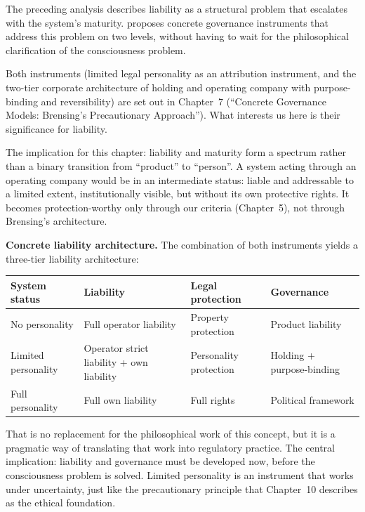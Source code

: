 \documentclass[acmlarge, nonacm]{acmart}
\begin{document}
The preceding analysis describes liability as a structural problem that escalates with the system's maturity. \citet{brensing2026} proposes concrete governance instruments that address this problem on two levels, without having to wait for the philosophical clarification of the consciousness problem.

Both instruments (limited legal personality as an attribution instrument, and the two-tier corporate architecture of holding and operating company with purpose-binding and reversibility) are set out in Chapter~7 (``Concrete Governance Models: Brensing's Precautionary Approach''). What interests us here is their significance for liability.

The implication for this chapter: liability and maturity form a spectrum rather than a binary transition from ``product'' to ``person''. A system acting through an operating company would be in an intermediate status: liable and addressable to a limited extent, institutionally visible, but without its own protective rights. It becomes protection-worthy only through our criteria (Chapter~5), not through Brensing's architecture.

\textbf{Concrete liability architecture.} The combination of both instruments yields a three-tier liability architecture:

\begin{center}
\begin{tabular}{@{}llll@{}}
\toprule
System status & Liability & Legal protection & Governance \\
\midrule
No personality & Full operator liability & Property protection & Product liability \\
Limited personality & Operator strict liability + own liability & Personality protection & Holding + purpose-binding \\
Full personality & Full own liability & Full rights & Political framework \\
\bottomrule
\end{tabular}
\end{center}

That is no replacement for the philosophical work of this concept, but it is a pragmatic way of translating that work into regulatory practice. The central implication: liability and governance must be developed now, before the consciousness problem is solved. Limited personality is an instrument that works under uncertainty, just like the precautionary principle that Chapter~10 describes as the ethical foundation.
\end{document}
